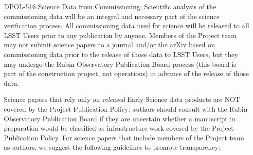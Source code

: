 \documentclass[SE,authoryear,toc]{lsstdoc}
\begin{document}
\begin{emph}
  {DPOL-516 Science Data from Commissioning: Scientific analysis of the commissioning data will be an integral and necessary part of the science verification process.
  All commissioning data used for science will be released to all LSST Users prior to any publication by anyone.
  Members of the Project team may not submit science papers to a journal and/or the arXiv based on commissioning data prior to the release of those data to LSST Users, but they may undergo the Rubin Observatory Publication Board process (this board is part of the construction project, not operations) in advance of the release of those data.}
\end{emph}

Science papers that rely only on \emph{released} Early Science data products are NOT covered by the Project Publication Policy; authors should consult with the Rubin Observatory Publication Board if they are uncertain whether a manuscript in preparation would be classified as infrastructure work covered by the Project Publication Policy.
For science papers that include members of the Project team as authors, we suggest the following guidelines to promote transparency:
\end{document}
